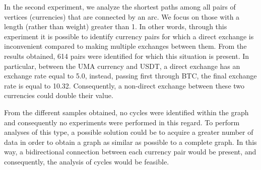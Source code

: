 In the second experiment, we analyze the shortest paths among all pairs of vertices (currencies) that are connected by an arc.
We focus on those with a length (rather than weight) greater than 1.
In other words, through this experiment it is possible to identify currency pairs for which a direct exchange is inconvenient compared to making multiple exchanges between them.
From the results obtained, 614 pairs were identified for which this situation is present. In particular, between the UMA currency and USDT, a direct exchange has an exchange rate equal to 5.0, instead, passing first through BTC, the final exchange rate is equal to 10.32. Consequently, a non-direct exchange between these two currencies could double their value.

From the different samples obtained, no cycles were identified within the graph and consequently no experiments were performed in this regard. To perform analyses of this type, a possible solution could be to acquire a greater number of data in order to obtain a graph as similar as possible to a complete graph. In this way, a bidirectional connection between each currency pair would be present, and consequently, the analysis of cycles would be feasible.
